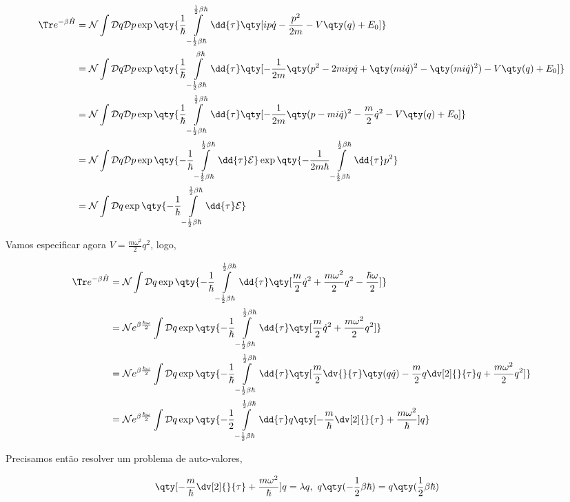\documentclass[twoside]{amsart}
\numberwithin{equation}{section}
\newcommand{\Dd}[1]{\mathcal D #1}
\begin{document}
\begin{refsection}
\begin{align}
    \Tr e^{-\beta\hat H}&=\mathcal N\int\Dd{q}\Dd{p}\exp\qty{\frac1\hbar\int\limits_{-\frac12\beta\hbar}^{\frac12\beta\hbar}\dd{\tau}\qty[ip\dot q-\frac{p^2}{2m}-V\qty(q)+E_0]}\\
    &=\mathcal N\int\Dd{q}\Dd{p}\exp\qty{\frac1\hbar\int\limits_{-\frac12\beta\hbar}^{\beta \hbar}\dd{\tau}\qty[-\frac{1}{2m}\qty(p^2-2mip\dot q+\qty(mi\dot q)^2-\qty(mi\dot q)^2)-V\qty(q)+E_0]}\\
    &=\mathcal N\int\Dd{q}\Dd{p}\exp\qty{\frac1\hbar\int\limits_{-\frac12\beta\hbar}^{\frac12\beta\hbar}\dd{\tau}\qty[-\frac{1}{2m}\qty(p-mi\dot q)^2-\frac m2{\dot q}^2-V\qty(q)+E_0]}\\
    &=\mathcal N\int\Dd{q}\Dd{p}\exp\qty{-\frac1\hbar\int\limits_{-\frac12\beta\hbar}^{\frac12\beta\hbar}\dd{\tau}\mathcal E}\exp\qty{-\frac{1}{2m\hbar}\int\limits_{-\frac12\beta\hbar}^{\frac12\beta\hbar}\dd{\tau}p^2}\\
    &=\mathcal N\int\Dd{q}\exp\qty{-\frac1\hbar\int\limits_{-\frac12\beta\hbar}^{\frac12\beta\hbar}\dd{\tau}\mathcal E}
\end{align}

Vamos especificar agora $V=\frac{m\omega^2}{2}q^2$, logo,

\begin{align}
    \Tr e^{-\beta\hat H}&=\mathcal N\int\Dd{q}\exp\qty{-\frac1\hbar\int\limits_{-\frac12\beta\hbar}^{\frac12\beta\hbar}\dd{\tau}\qty[\frac m2{\dot q}^2+\frac{m\omega^2}{2}q^2-\frac{\hbar \omega}{2}]}\\
    &=\mathcal Ne^{\beta\frac{\hbar \omega}{2}}\int\Dd{q}\exp\qty{-\frac1\hbar\int\limits_{-\frac12\beta\hbar}^{\frac12\beta\hbar}\dd{\tau}\qty[\frac m2{\dot q}^2+\frac{m\omega^2}{2}q^2]}\\
    &=\mathcal Ne^{\beta\frac{\hbar \omega}{2}}\int\Dd{q}\exp\qty{-\frac1\hbar\int\limits_{-\frac12\beta\hbar}^{\frac12\beta\hbar}\dd{\tau}\qty[\frac m2\dv{}{\tau}\qty(q\dot q)-\frac m2q\dv[2]{}{\tau}q+\frac{m\omega^2}{2}q^2]}\\
    &=\mathcal Ne^{\beta\frac{\hbar \omega}{2}}\int\Dd{q}\exp\qty{-\frac12\int\limits_{-\frac12\beta\hbar}^{\frac12\beta\hbar}\dd{\tau}q\qty[-\frac m\hbar \dv[2]{}{\tau}+\frac{m\omega^2}{\hbar}]q}
\end{align}

Precisamos então resolver um problema de auto-valores,

\begin{align}
    \qty[-\frac m\hbar \dv[2]{}{\tau}+\frac{m\omega^2}{\hbar}]q&=\lambda q,\ q\qty(-\frac12\beta\hbar)=q\qty(\frac12\beta\hbar)
\end{align}


\end{refsection}
\end{document}
